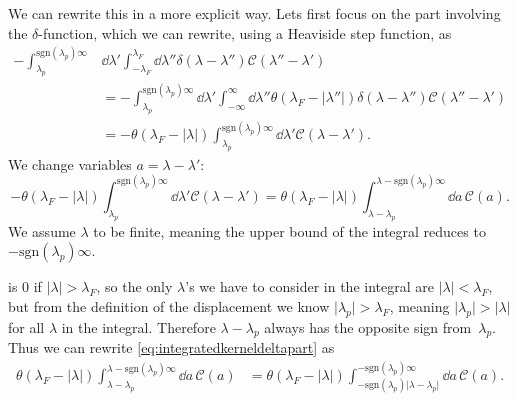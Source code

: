 \documentclass[11pt, a4paper]{report} %
\newcommand{\kernel}{\mathcal{C}}
\begin{document}
\begin{sloppypar}
We can rewrite this in a more explicit way.
Lets first focus on the part involving the \(\delta\)-function, which we can rewrite, using a Heaviside step function, as
\begin{align}
	- \int_{\lambda_p}^{\textrm{sgn}(\lambda_p)\infty} &\dd \lambda' \int_{-\lambda_F}^{\lambda_F} \dd  \lambda'' \delta(\lambda-\lambda'') \kernel(\lambda''-\lambda') \\
	&=- \int_{\lambda_p}^{\textrm{sgn}(\lambda_p)\infty} \dd \lambda' \int_{-\infty}^{\infty} \dd \lambda'' \theta(\lambda_F - \lvert \lambda'' \rvert)  \delta(\lambda-\lambda'') \kernel(\lambda''-\lambda')\\
	&= - \theta(\lambda_F - \lvert \lambda \rvert) \int_{\lambda_p}^{\textrm{sgn}(\lambda_p)\infty} \dd \lambda'     \kernel(\lambda-\lambda').
\end{align}
We change variables \(a=\lambda-\lambda'\):
\begin{equation}\label{eq:integratedkerneldeltapart}
	- \theta(\lambda_F - \lvert \lambda \rvert) \int_{\lambda_p}^{\textrm{sgn}(\lambda_p)\infty} \dd \lambda'     \kernel(\lambda-\lambda')=
	 \theta(\lambda_F - \lvert \lambda \rvert) \int_{\lambda-\lambda_p}^{\lambda - \textrm{sgn}(\lambda_p)\infty} \dd a\,\kernel(a).
\end{equation}
We assume \(\lambda\) to be finite, meaning the upper bound of the integral reduces to \(-\textrm{sgn}(\lambda_p)\infty\).
\end{sloppypar}

 is 0 if \(\lvert \lambda\rvert > \lambda_F\), so the only \(\lambda\)'s we have to consider in the integral are \(\lvert\lambda\rvert< \lambda_F\), but from the definition of the displacement we know \(\lvert\lambda_p\rvert >\lambda_F\), meaning \(\lvert\lambda_p\rvert > \lvert\lambda\rvert\) for all \(\lambda\) in the integral.
Therefore \(\lambda-\lambda_p\) always has the opposite sign from~\(\lambda_p\).
Thus we can rewrite \cref{eq:integratedkerneldeltapart} as
\begin{align}
	\theta(\lambda_F - \lvert \lambda \rvert) \int_{\lambda-\lambda_p}^{\lambda - \textrm{sgn}(\lambda_p)\infty} \dd a\,\kernel(a) &=
	\theta(\lambda_F - \lvert \lambda \rvert) \int_{-\textrm{sgn}(\lambda_p)\lvert\lambda-\lambda_p\rvert}^{ - \textrm{sgn}(\lambda_p)\infty} \dd a\,\kernel(a).
\end{align}
\end{document}
